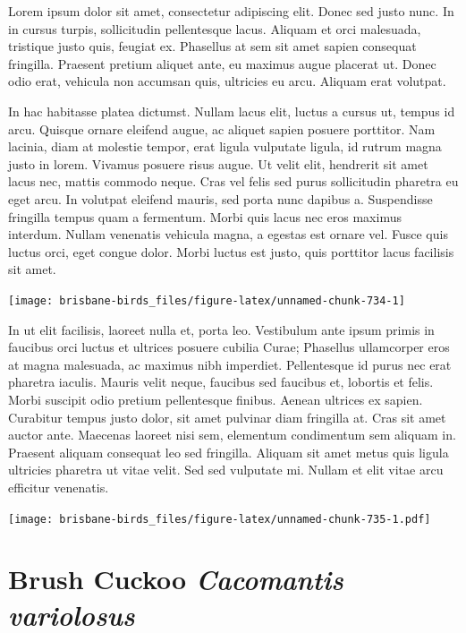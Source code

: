 \documentclass[]{book}
\let\origfigure\figure
\let\endorigfigure\endfigure
\renewenvironment{figure}[1][2] {
  \expandafter\origfigure\expandafter[H]
} {
  \endorigfigure
}
\begin{document}
Lorem ipsum dolor sit amet, consectetur adipiscing elit. Donec sed justo
nunc. In in cursus turpis, sollicitudin pellentesque lacus. Aliquam et
orci malesuada, tristique justo quis, feugiat ex. Phasellus at sem sit
amet sapien consequat fringilla. Praesent pretium aliquet ante, eu
maximus augue placerat ut. Donec odio erat, vehicula non accumsan quis,
ultricies eu arcu. Aliquam erat volutpat.

In hac habitasse platea dictumst. Nullam lacus elit, luctus a cursus ut,
tempus id arcu. Quisque ornare eleifend augue, ac aliquet sapien posuere
porttitor. Nam lacinia, diam at molestie tempor, erat ligula vulputate
ligula, id rutrum magna justo in lorem. Vivamus posuere risus augue. Ut
velit elit, hendrerit sit amet lacus nec, mattis commodo neque. Cras vel
felis sed purus sollicitudin pharetra eu eget arcu. In volutpat eleifend
mauris, sed porta nunc dapibus a. Suspendisse fringilla tempus quam a
fermentum. Morbi quis lacus nec eros maximus interdum. Nullam venenatis
vehicula magna, a egestas est ornare vel. Fusce quis luctus orci, eget
congue dolor. Morbi luctus est justo, quis porttitor lacus facilisis sit
amet.

\begin{figure}
\texttt{[image: brisbane-birds\_files/figure-latex/unnamed-chunk-734-1]} \caption{insert figure caption}\label{fig:unnamed-chunk-734}
\end{figure}

In ut elit facilisis, laoreet nulla et, porta leo. Vestibulum ante ipsum
primis in faucibus orci luctus et ultrices posuere cubilia Curae;
Phasellus ullamcorper eros at magna malesuada, ac maximus nibh
imperdiet. Pellentesque id purus nec erat pharetra iaculis. Mauris velit
neque, faucibus sed faucibus et, lobortis et felis. Morbi suscipit odio
pretium pellentesque finibus. Aenean ultrices ex sapien. Curabitur
tempus justo dolor, sit amet pulvinar diam fringilla at. Cras sit amet
auctor ante. Maecenas laoreet nisi sem, elementum condimentum sem
aliquam in. Praesent aliquam consequat leo sed fringilla. Aliquam sit
amet metus quis ligula ultricies pharetra ut vitae velit. Sed sed
vulputate mi. Nullam et elit vitae arcu efficitur venenatis.

\begin{figure}
\centering
\texttt{[image: brisbane-birds\_files/figure-latex/unnamed-chunk-735-1.pdf]}
\caption{\label{fig:unnamed-chunk-735}insert figure caption}
\end{figure}

\section{\texorpdfstring{Brush Cuckoo \emph{Cacomantis
variolosus}}{Brush Cuckoo Cacomantis variolosus}}\label{brush-cuckoo-cacomantis-variolosus}
\end{document}
